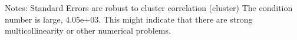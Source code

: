 Notes: \newline
 [1] Standard Errors are robust to cluster correlation (cluster) \newline
 [2] The condition number is large, 4.05e+03. This might indicate that there are \newline
 strong multicollinearity or other numerical problems.